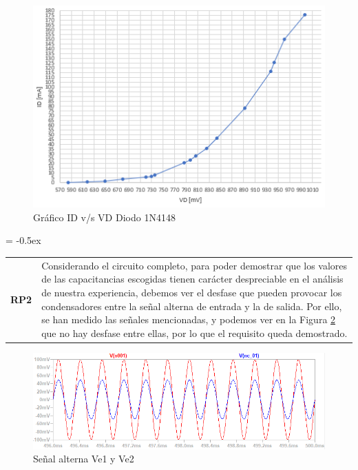 \begin{figure}[h]
    \Centering
    \includegraphics[scale=0.55]{Imagenes/7Resultados/diodo1n4148.png}
    \caption{Gráfico ID v/s VD Diodo 1N4148}
	\label{fig:figure10}
\end{figure}

\centering
\extrarowheight = -0.5ex
\renewcommand{\arraystretch}{2.25}
\begin{tabular}{p{} p{}}
\textbf{RP2} & Considerando el circuito completo, para poder demostrar que los valores de las capacitancias escogidas tienen carácter despreciable en el análisis de nuestra experiencia, debemos ver el desfase que pueden provocar los condensadores entre la señal alterna de entrada y la de salida. Por ello, se han medido las señales mencionadas, y podemos ver en la Figura \ref{fig:figure11} que no hay desfase entre ellas, por lo que el requisito queda demostrado. \\ 

\end{tabular}

\begin{figure}[h]
    \Centering
    \includegraphics[scale=0.6]{Imagenes/7Resultados/ve1vs1.PNG}
    \caption{Señal alterna Ve1 y Ve2}
	\label{fig:figure11}
\end{figure}

